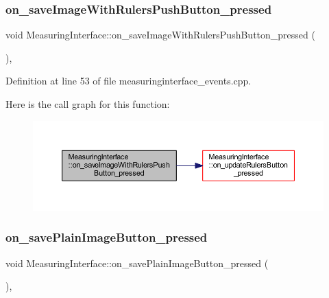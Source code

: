 \subsubsection{\texorpdfstring{on\_saveImageWithRulersPushButton\_pressed}{on\_saveImageWithRulersPushButton\_pressed}}
{\footnotesize\ttfamily void Measuring\+Interface\+::on\+\_\+save\+Image\+With\+Rulers\+Push\+Button\+\_\+pressed (\begin{DoxyParamCaption}{ }\end{DoxyParamCaption})\hspace{0.3cm}{\ttfamily [private]}, {\ttfamily [slot]}}



Definition at line 53 of file measuringinterface\+\_\+events.\+cpp.

Here is the call graph for this function\+:
\nopagebreak
\begin{figure}[H]
\begin{center}
\leavevmode
\includegraphics[width=350pt]{classMeasuringInterface_a87fcf4623df1c9af6663fe236bb3dd0e_cgraph}
\end{center}
\end{figure}
\mbox{\label{classMeasuringInterface_abbb97e89e646574ba20297556e666cc7}} 
\subsubsection{\texorpdfstring{on\_savePlainImageButton\_pressed}{on\_savePlainImageButton\_pressed}}
{\footnotesize\ttfamily void Measuring\+Interface\+::on\+\_\+save\+Plain\+Image\+Button\+\_\+pressed (\begin{DoxyParamCaption}{ }\end{DoxyParamCaption})\hspace{0.3cm}{\ttfamily [private]}, {\ttfamily [slot]}}



